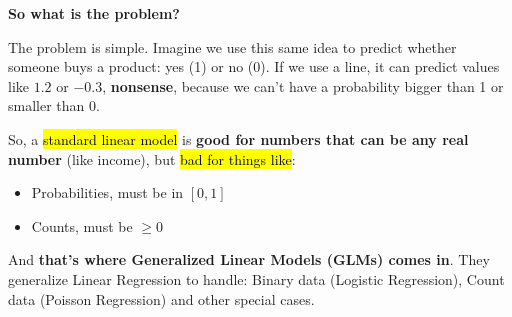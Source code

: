 \highspace
\begin{flushleft}
    \textcolor{Red2}{ \textbf{So what is the problem?}}
\end{flushleft}
The problem is simple. Imagine we use this same idea to predict whether someone buys a product: yes (1) or no (0). If we use a line, it can predict values like $1.2$ or $-0.3$, \textbf{nonsense}, because we can't have a probability bigger than 1 or smaller than 0.

\highspace
So, a \hl{standard linear model} is \textbf{good for numbers that can be any real number} (like income), but \hl{bad for things like}:
\begin{itemize}
    \item Probabilities, must be in $\left[0, 1\right]$
    \item Counts, must be $\ge 0$
\end{itemize}
And \textbf{that's where Generalized Linear Models (GLMs) comes in}. They generalize Linear Regression to handle: Binary data (Logistic Regression), Count data (Poisson Regression) and other special cases.
